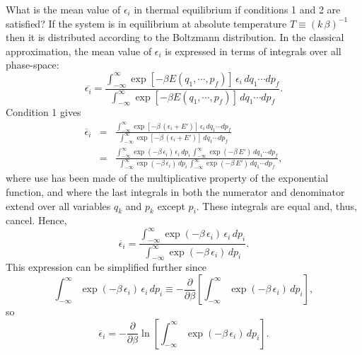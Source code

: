 What is the mean value of $\epsilon_i$ in thermal equilibrium if conditions
1 and 2 are satisfied? If the system is in equilibrium at absolute temperature
$T\equiv (k\,\beta)^{-1}$ then it is distributed according to the Boltzmann 
distribution. In the classical approximation,
the mean value of $\epsilon_i$ is expressed in terms of
integrals over all phase-space:
\begin{equation}
\overline{\epsilon_i} = \frac{
\int_{-\infty}^{\infty} \exp[-\beta E(q_1,\cdots, p_f)]\,
\epsilon_i
\,dq_1\cdots dp_f}
{\int_{-\infty}^{\infty} \exp[-\beta E(q_1,\cdots, p_f)]\,
dq_1\cdots dp_f}.
\end{equation}
Condition 1 gives
\begin{eqnarray}
\overline{\epsilon}_i&=&\frac{
\int_{-\infty}^{\infty} \exp[-\beta\,(\epsilon_i + E')]\,
\epsilon_i
\,dq_1\cdots dp_f}
{\int_{-\infty}^{\infty} \exp[-\beta\,(\epsilon_i + E')]\,dq_1\cdots dp_f}\nonumber
\\[0.5ex]
&=& \frac{\int_{-\infty}^{\infty} \exp(-\beta \,\epsilon_i)\,\epsilon_i\, dp_i
\,\int_{-\infty}^{\infty} \exp(-\beta \,E')\,dq_1\cdots dp_f}
{\int_{-\infty}^{\infty} \exp(-\beta \,\epsilon_i)\, dp_i
\,\int_{-\infty}^{\infty} \exp(-\beta \,E')\,dq_1\cdots dp_f},
\end{eqnarray}
where use has been made of the multiplicative property of the exponential function,
and where the last integrals in both the numerator and denominator extend over
all variables
 $q_k$ and $p_k$ except $p_i$. These integrals are equal and, thus, cancel.
Hence,
\begin{equation}
\overline{\epsilon}_i = \frac{\int_{-\infty}^{\infty} \exp(-\beta \,\epsilon_i)\,\epsilon_i\, dp_i}
{\int_{-\infty}^{\infty}\exp(-\beta\, \epsilon_i)\, dp_i}.
\end{equation}
This expression can be simplified further since
\begin{equation}
\int_{-\infty}^\infty
  \exp(-\beta \,\epsilon_i)\,\epsilon_i\, dp_i \equiv - \frac{\partial }{\partial \beta}
\left[\int_{-\infty}^\infty \exp(-\beta \,\epsilon_i)\, dp_i\right],
\end{equation}
so
\begin{equation}\label{e7.102}
\overline{\epsilon}_i = - \frac{\partial}{\partial\beta}
 \ln\left[\int_{-\infty}^\infty \exp(-\beta \,\epsilon_i)\, 
dp_i\right].
\end{equation}

